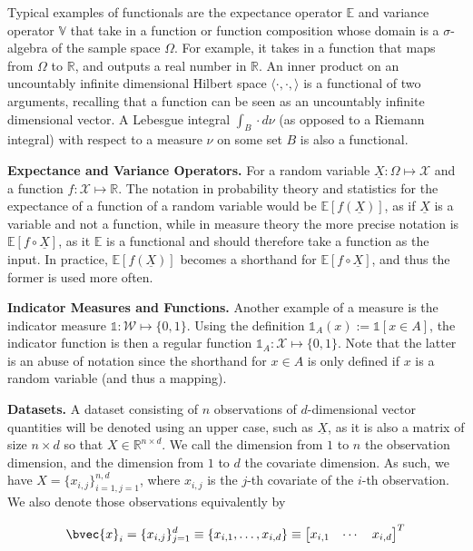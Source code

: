 \documentclass[twoside]{article} \usepackage{aistats2017}
\newcommand{\rv}[1]{\underline{#1}}
\begin{document}
	Typical examples of functionals are the expectance operator $\mathbb{E}$ and variance operator $\mathbb{V}$ that take in a function or function composition whose domain is a $\sigma$-algebra of the sample space $\Omega$. For example, it takes in a function that maps from $\Omega$ to $\mathbb{R}$, and outputs a real number in $\mathbb{R}$. An inner product on an uncountably infinite dimensional Hilbert space $\langle \cdot, \cdot, \rangle$ is a functional of two arguments, recalling that a function can be seen as an uncountably infinite dimensional vector. A Lebesgue integral $\int_{B} \cdot d\nu$ (as opposed to a Riemann integral) with respect to a measure $\nu$ on some set $B$ is also a functional.
	
	\textbf{Expectance and Variance Operators.} For a random variable $\rv{X} : \Omega \mapsto \mathcal{X}$ and a function $f : \mathcal{X} \mapsto \mathbb{R}$. The notation in probability theory and statistics for the expectance of a function of a random variable would be $\mathbb{E}[f(\rv{X})]$, as if $\rv{X}$ is a variable and not a function, while in measure theory the more precise notation is $\mathbb{E}[f \circ \rv{X}]$, as it $\mathbb{E}$ is a functional and should therefore take a function as the input. In practice, $\mathbb{E}[f(\rv{X})]$ becomes a shorthand for $\mathbb{E}[f \circ \rv{X}]$, and thus the former is used more often.
	
	\textbf{Indicator Measures and Functions.} Another example of a measure is the indicator measure $\mathbb{1} : \mathcal{W} \mapsto \{0, 1\}$. Using the definition $\mathbb{1}_{A}(x) := \mathbb{1}[x \in A]$, the indicator function is then a regular function $\mathbb{1}_{A} : \mathcal{X} \mapsto \{0, 1\}$. Note that the latter is an abuse of notation since the shorthand for $x \in A$ is only defined if $x$ is a random variable (and thus a mapping). 
	
	\textbf{Datasets.} A dataset consisting of $n$ observations of $d$-dimensional vector quantities will be denoted using an upper case, such as $\underline{X}$, as it is also a matrix of size $n \times d$ so that $X \in \mathbb{R}^{n \times d}$. We call the dimension from $1$ to $n$ the observation dimension, and the dimension from $1$ to $d$ the covariate dimension. As such, we have $X = \{x_{i, j}\}_{i = 1, j = 1}^{n, d}$, where $x_{i, j}$ is the $j$-th covariate of the $i$-th observation. We also denote those observations equivalently by

	\begin{equation}
	\bvec{x}_{i} = \{x_{i, j}\}_{j = 1}^{d} \equiv \{x_{i, 1}, \dots, x_{i, d}\} \equiv \begin{bmatrix}
	x_{i, 1} & \cdots & x_{i, d}
	\end{bmatrix}^{T}
	\label{eq:data_vector_notation}
	\end{equation}
	
\end{document}
